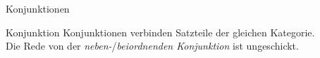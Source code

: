 \begin{frame}
  {Konjunktionen}
  \pause
  \begin{exe}
    \ex\label{ex:konjunktionen052}
    \begin{xlist}
      \pause
      \pause
      \pause
      \pause
      \pause
      \pause
    \end{xlist}
  \end{exe}
  \Zeile
  \begin{block}{Konjunktion}
    Konjunktionen verbinden Satzteile der gleichen Kategorie.\\
    Die Rede von der \textit{neben-}\slash\textit{beiordnenden Konjunktion} ist ungeschickt. 
  \end{block}
\end{frame}

